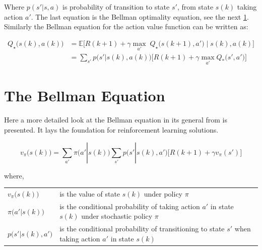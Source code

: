 Where $ p(s'|s,a) $ is  probability of transition to state $ s' $, from state $ s(k) $ taking action $ a' $. The last equation is the Bellman optimality equation, see the next \cref{sec:Bellman}. Similarly the Bellman equation for the action value function can be written as:


\begin{equation}
	\begin{split}
		Q_{\star}\bigg(s(k),a(k)\bigg)&=\mathbb{E}\bigg[R(k+1) + \gamma \underset{a'}{\max} \; Q_{\star}\big(s(k+1),a'\big) \; \big| \; s(k),a(k)\bigg]\\
		&= \sum_{s'}p\bigg(s'|s(k),a(k)\bigg)\bigg[R(k+1)+\gamma \max_{a'}Q_{*}\big(s',a'\big)\bigg]
	\end{split}
\end{equation}
 
\newpage

\section{The Bellman Equation} \label{sec:Bellman}
Here a more detailed look at the Bellman equation in its general from is presented. It lays the foundation for reinforcement learning solutions.  

\begin{equation}\label{eq:Bellman}
	v_{\pi}\bigg(s(k)\bigg)=\sum_{a'}\pi\bigg(a'|s(k)\bigg)\sum_{s'}p\bigg(s'|s(k),a'\bigg)\bigg[R(k+1)+\gamma v_{\pi}(s')\bigg]
\end{equation}

where,
\begin{center}
	\begin{tabular}{l p{12cm}}
		$v_{\pi}\bigg(s(k)\bigg) $ & is the  value of state $ s(k) $ under policy $ \pi $\\ 
		$ \pi\bigg(a'|s(k)\bigg) $ & is the conditional probability of taking action $ a' $ in state $ s(k) $ under stochastic policy $ \pi $\\
		$ p\bigg(s'|s(k),a'\bigg) $ & is the conditional probability of transitioning to state $ s' $ when taking action $ a' $ in state $ s(k) $ \\
	\end{tabular}
\end{center}

